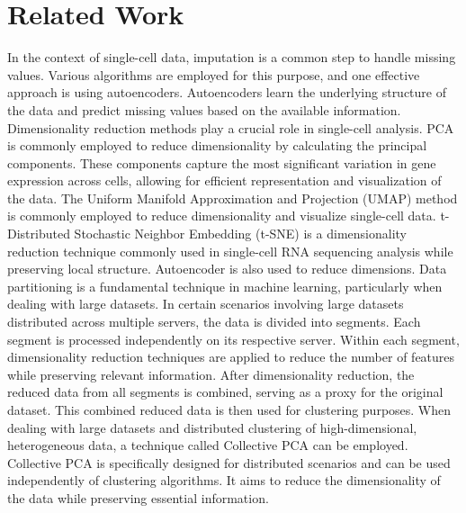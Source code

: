 \section{Related Work}
In the context of single-cell data, imputation is a common step to handle missing values. Various algorithms are employed for this purpose, and one effective approach is using autoencoders\cite{autoimpute1}. Autoencoders learn the underlying structure of the data and predict missing values based on the available information.  Dimensionality reduction methods play a crucial role in single-cell analysis. PCA is commonly employed to reduce dimensionality by calculating the principal components. These components capture the most significant variation in gene expression across cells, allowing for efficient representation and visualization of the data\cite{pcaapplication}. The Uniform Manifold Approximation and Projection (UMAP) method is commonly employed to reduce dimensionality and visualize single-cell data\cite{umapapplication}. t-Distributed Stochastic Neighbor Embedding (t-SNE) is a dimensionality reduction technique commonly used in single-cell RNA sequencing analysis while preserving local structure\cite{tsneapplication}. Autoencoder is also used to reduce dimensions\cite{autoencoderapplication}. Data partitioning is a fundamental technique in machine learning, particularly when dealing with large datasets\cite{datap1}. In certain scenarios involving large datasets distributed across multiple servers, the data is divided into segments. Each segment is processed independently on its respective server\cite{d1}. Within each segment, dimensionality reduction techniques are applied to reduce the number of features while preserving relevant information. After dimensionality reduction, the reduced data from all segments is combined, serving as a proxy for the original dataset\cite{d2}. This combined reduced data is then used for clustering purposes. When dealing with large datasets and distributed clustering of high-dimensional, heterogeneous data, a technique called Collective PCA can be employed. Collective PCA is specifically designed for distributed scenarios and can be used independently of clustering algorithms. It aims to reduce the dimensionality of the data while preserving essential information\cite{d3}.